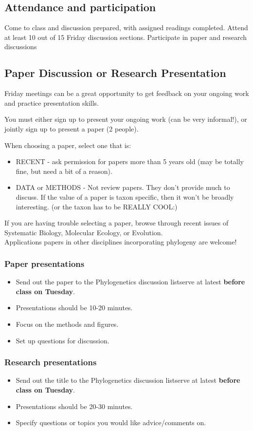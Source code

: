 \documentclass{article}
\begin{document}
\subsection*{Attendance and participation}
Come to class and discussion prepared, with assigned readings completed.
Attend at least 10 out of 15 Friday discussion sections.
Participate in paper and research discussions

\subsection*{Paper Discussion or Research Presentation}
Friday meetings can be a great opportunity to get feedback on your ongoing work and practice presentation skills.

You must either sign up to present your ongoing work (can be very informal!), or jointly sign up to present a paper (2 people).

When choosing a paper, select one that is:
\begin{itemize}
 \item RECENT - ask permission for papers more than 5 years old (may be totally fine, but need a bit of a reason).
 \item DATA or METHODS - Not review papers. They don't provide much to discuss. If the value of a paper is taxon specific, then it won't be broadly interesting. (or the taxon has to be REALLY COOL:)
\end{itemize}
If you are having trouble selecting a paper, browse through recent issues of Systematic Biology, Molecular Ecology, or Evolution.\\
Applications papers in other disciplines incorporating phylogeny are welcome!\\

\subsubsection*{Paper presentations}
\begin{itemize}
 \item Send out the paper to the Phylogenetics discussion listserve at latest \textbf{before class on Tuesday}.
 \item Presentations should be 10-20 minutes.
 \item Focus on the methods and figures.
 \item Set up questions for discussion.
\end{itemize}

\subsubsection*{Research presentations}
\begin{itemize}
 \item Send out the title to the Phylogenetics discussion listserve at latest \textbf{before class on Tuesday}.
 \item Presentations should be 20-30 minutes.
 \item Specify questions or topics you would like advice/comments on.
\end{itemize}
\end{document}

